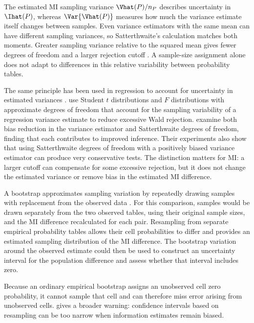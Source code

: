 The estimated MI sampling variance \(\Vhat(P)/n_P\) describes uncertainty
in \(\Ihat(P)\), whereas \(\Var\{\Vhat(P)\}\) measures how much the
variance estimate itself changes between samples. Even variance estimators
with the same mean can have different sampling variances, so Satterthwaite's
calculation matches both moments. Greater sampling variance relative to the
squared mean gives fewer degrees of freedom and a larger rejection cutoff
\citep{satterthwaite1946}. A sample-size assignment alone does not adapt
to differences in this relative variability between probability tables.

The same principle has been used in regression to account for
uncertainty in estimated variances
\citep{panwall2002,bell2002,kauermann2001,fay2001,imbens2016}.
\citet{panwall2002} use Student \(t\) distributions and \(F\) distributions with
approximate degrees of freedom that account for the sampling variability
of a regression variance estimate to reduce excessive Wald rejection.
\citet{bell2002} examine both
bias reduction in the variance estimator and Satterthwaite degrees of
freedom, finding that each contributes to improved inference. Their
experiments also show that using Satterthwaite degrees of freedom with a
positively biased variance estimator can produce very conservative tests.
The distinction matters for MI: a larger cutoff can compensate for some
excessive rejection, but it does not change the estimated variance or
remove bias in the estimated MI difference.

\medskip
{}

A bootstrap approximates sampling variation by repeatedly drawing samples
with replacement from the observed data \citep{efron1979}. For this
comparison, samples would be drawn separately from the two observed tables,
using their original sample sizes, and the MI difference recalculated for
each pair. Resampling from separate empirical probability tables allows
their cell probabilities to differ and provides an estimated sampling
distribution of the MI difference. The bootstrap
variation around the observed estimate could then be used to construct
an uncertainty interval for the population difference and assess whether
that interval includes zero.

Because an ordinary empirical bootstrap assigns an unobserved cell zero
probability, it cannot sample that cell and can therefore miss error
arising from unobserved cells. \citet{paninski2003} gives a broader warning: confidence
intervals based on resampling can be too narrow when information estimates
remain biased.

